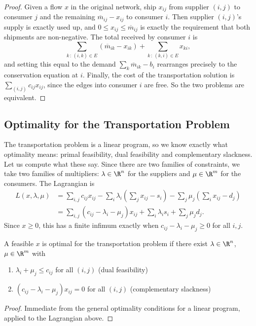 \documentclass[a4paper]{scrartcl}
\begin{document}
\begin{proof}
    Given a flow $x$ in the original network, ship $x_{ij}$ from supplier $(i,j)$ to consumer $j$ and the remaining $\overline m_{ij} - x_{ij}$ to consumer $i$. Then supplier $(i,j)$'s supply is exactly used up, and $0 \leq x_{ij} \leq \overline m_{ij}$ is exactly the requirement that both shipments are non-negative. The total received by consumer $i$ is
    $$
    \sum_{k\,:\,(i,k)\in E}(\overline m_{ik} - x_{ik}) + \sum_{k\,:\,(k,i)\in E}x_{ki},
    $$
    and setting this equal to the demand $\sum_k \overline m_{ik} - b_i$ rearranges precisely to the conservation equation at $i$. Finally, the cost of the transportation solution is $\sum_{(i,j)}c_{ij}x_{ij}$, since the edges into consumer $i$ are free. So the two problems are equivalent.
\end{proof}

\subsection{Optimality for the Transportation Problem}

The transportation problem is a linear program, so we know exactly what optimality means: primal feasibility, dual feasibility and complementary slackness. Let us compute what these say. Since there are two families of constraints, we take two families of multipliers: $\lambda \in \R^n$ for the suppliers and $\mu \in \R^m$ for the consumers. The Lagrangian is
\begin{align*}
    L(x,\lambda,\mu) &= \sum_{i,j}c_{ij}x_{ij} - \sum_{i}\lambda_i\left(\sum_j x_{ij} - s_i\right) - \sum_j\mu_j\left(\sum_i x_{ij} - d_j\right)\\
    &= \sum_{i,j}\left(c_{ij} - \lambda_i - \mu_j\right)x_{ij} + \sum_i\lambda_i s_i + \sum_j\mu_j d_j.
\end{align*}
Since $x \geq 0$, this has a finite infimum exactly when $c_{ij} - \lambda_i - \mu_j \geq 0$ for all $i,j$.

\begin{theorem}
    A feasible $x$ is optimal for the transportation problem if there exist $\lambda \in \R^n$, $\mu \in \R^m$ with
    \begin{enumerate}[label=(\roman*)]
        \item $\lambda_i + \mu_j \leq c_{ij}$ for all $(i,j)$ \hfill (dual feasibility)
        \item $\left(c_{ij} - \lambda_i - \mu_j\right)x_{ij} = 0$ for all $(i,j)$ \hfill (complementary slackness)
    \end{enumerate}
\end{theorem}
\begin{proof}
    Immediate from the general optimality conditions for a linear program, applied to the Lagrangian above.
\end{proof}
\end{document}

